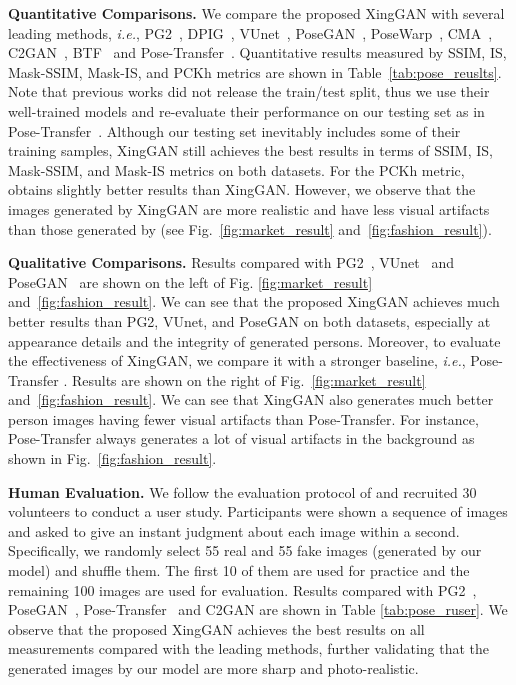 \documentclass[runningheads]{llncs}
\begin{document}
\noindent \textbf{Quantitative Comparisons.}
We compare the proposed XingGAN with several leading methods, \emph{i.e.}, PG2~\cite{ma2017pose}, DPIG~\cite{ma2018disentangled}, VUnet~\cite{esser2018variational}, PoseGAN~\cite{siarohin2018deformable}, PoseWarp~\cite{balakrishnan2018synthesizing}, CMA~\cite{chi2019two}, C2GAN~\cite{tang2019cycle}, BTF~\cite{albahar2019guided} and Pose-Transfer~\cite{zhu2019progressive}.
Quantitative results measured by SSIM, IS, Mask-SSIM, Mask-IS, and PCKh metrics are shown in Table~\ref{tab:pose_reuslts}.
Note that previous works \cite{ma2017pose,siarohin2018deformable} did not release the train/test split, thus we use their well-trained models and re-evaluate their performance on our testing set as in Pose-Transfer~\cite{zhu2019progressive}.
Although our testing set inevitably includes some of their training samples, XingGAN still achieves the best results in terms of SSIM, IS, Mask-SSIM, and Mask-IS metrics on both datasets.
For the PCKh metric, \cite{zhu2019progressive} obtains slightly better results than XingGAN.
However, we observe that the images generated by XingGAN are more realistic and have less visual artifacts than those generated by \cite{zhu2019progressive}  (see Fig.~\ref{fig:market_result} and~\ref{fig:fashion_result}).

\noindent \textbf{Qualitative Comparisons.}
Results compared with PG2~\cite{ma2017pose}, VUnet~\cite{esser2018variational} and PoseGAN~\cite{siarohin2018deformable} are shown on the left of Fig. \ref{fig:market_result} and~\ref{fig:fashion_result}. 
We can see that the proposed XingGAN achieves much better results than PG2, VUnet, and PoseGAN on both datasets, especially at appearance details and the integrity of generated persons.
Moreover, to evaluate the effectiveness of XingGAN, we compare it with a stronger baseline, \emph{i.e.}, Pose-Transfer \cite{zhu2019progressive}.
Results are shown on the right of Fig.~\ref{fig:market_result} and~\ref{fig:fashion_result}.
We can see that XingGAN also generates much better person images having fewer visual artifacts than Pose-Transfer.
For instance, Pose-Transfer \cite{zhu2019progressive} always generates a lot of visual artifacts in the background as shown in Fig.~\ref{fig:fashion_result}.


\noindent \textbf{Human Evaluation.}
We follow the evaluation protocol of \cite{ma2017pose,siarohin2018deformable,zhu2019progressive} and recruited 30 volunteers to conduct a user study.
Participants were shown a sequence of images and asked to give an instant judgment about each image within a second.
Specifically, we randomly select 55 real and 55 fake images (generated by our model) and shuffle them.
The first 10 of them are used for practice and the remaining 100 images are used for evaluation.
Results compared with PG2~\cite{ma2017pose}, PoseGAN~\cite{siarohin2018deformable}, Pose-Transfer~\cite{zhu2019progressive} and C2GAN \cite{tang2019cycle} are shown in Table \ref{tab:pose_ruser}.
We observe that the proposed XingGAN achieves the best results on all measurements compared with the leading methods, further validating that the generated images by our model are more sharp and photo-realistic.
\end{document}
